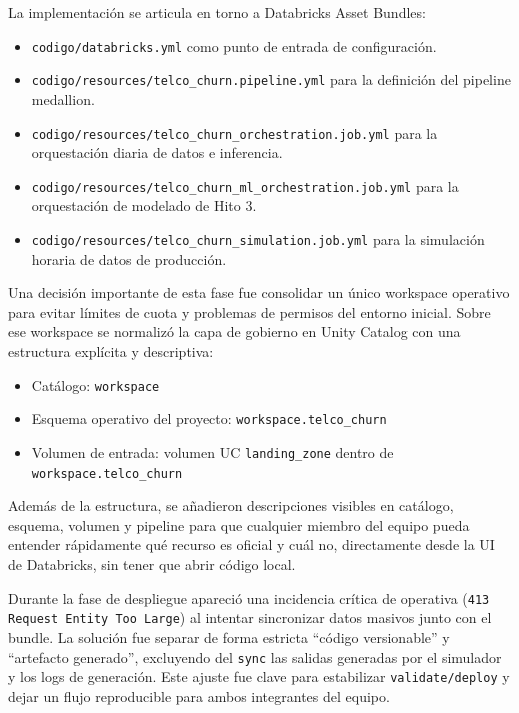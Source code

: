 \documentclass[12pt,a4paper]{article}
\begin{document}
La implementación se articula en torno a Databricks Asset Bundles:\par

\begin{itemize}
\item \nolinkurl{codigo/databricks.yml} como punto de entrada de configuración.
\item \nolinkurl{codigo/resources/telco_churn.pipeline.yml} para la definición del pipeline medallion.
\item \nolinkurl{codigo/resources/telco_churn_orchestration.job.yml} para la orquestación diaria de datos e inferencia.
\item \nolinkurl{codigo/resources/telco_churn_ml_orchestration.job.yml} para la orquestación de modelado de Hito 3.
\item \nolinkurl{codigo/resources/telco_churn_simulation.job.yml} para la simulación horaria de datos de producción.
\end{itemize}

Una decisión importante de esta fase fue consolidar un único workspace operativo para evitar límites de cuota y problemas de permisos del entorno inicial. Sobre ese workspace se normalizó la capa de gobierno en Unity Catalog con una estructura explícita y descriptiva:\par

\begin{itemize}
\item Catálogo: \nolinkurl{workspace}
\item Esquema operativo del proyecto: \nolinkurl{workspace.telco_churn}
\item Volumen de entrada: volumen UC \nolinkurl{landing_zone} dentro de \nolinkurl{workspace.telco_churn}
\end{itemize}

Además de la estructura, se añadieron descripciones visibles en catálogo, esquema, volumen y pipeline para que cualquier miembro del equipo pueda entender rápidamente qué recurso es oficial y cuál no, directamente desde la UI de Databricks, sin tener que abrir código local.\par

Durante la fase de despliegue apareció una incidencia crítica de operativa (\nolinkurl{413 Request Entity Too Large}) al intentar sincronizar datos masivos junto con el bundle. La solución fue separar de forma estricta “código versionable” y “artefacto generado”, excluyendo del \nolinkurl{sync} las salidas generadas por el simulador y los logs de generación. Este ajuste fue clave para estabilizar \nolinkurl{validate/deploy} y dejar un flujo reproducible para ambos integrantes del equipo.\par
\end{document}
